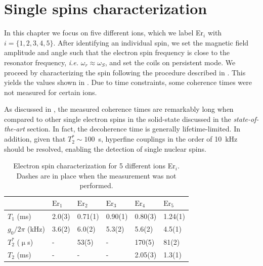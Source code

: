 
\section{Single \Er spins characterization}

In this chapter we focus on five different \Er ions, which we label Er$_i$ with $i=\{1,2,3,4,5\}$. After identifying an individual \Er spin, we set the magnetic field amplitude and angle such that the electron spin frequency is close to the resonator frequency, \textit{i.e.} $\omega_r\approx\omega_S$, and set the coils on persistent mode. We proceed by characterizing the spin following the procedure described in . This yields the values shown in . Due to time constraints, some coherence times were not measured for certain ions. 

As discussed in , the measured coherence times are remarkably long when compared to other single electron spins in the solid-state discussed in the \textit{state-of-the-art} section. In fact, the decoherence time is generally lifetime-limited. In addition, given that $T_2^*\sim100$~\textmu s, hyperfine couplings in the order of 10~kHz should be resolved, enabling the detection of single \W nuclear spins.

\begin{table}
\begin{tabular}{|l|l|l|l|l|l|}
\hline
                 & \textbf{$\mathrm{Er}_1$} & \textbf{$\mathrm{Er}_2$} & \textbf{$\mathrm{Er}_3$} & \textbf{$\mathrm{Er}_4$} & \textbf{$\mathrm{Er}_5$}  \\ \hline
$T_1$ (ms)       & 2.0(3)              & 0.71(1)             & 0.90(1)         & 0.80(3)          & 1.24(1)          \\ \hline
$g_0/2\pi$ (kHz) & 3.6(2)              & 6.0(2)              & 5.3(2)          & 5.6(2)           & 4.5(1)          \\ \hline
$T^*_2$ ($\upmu$s) & -                 & 53(5)               & -               & 170(5)           & 81(2)           \\ \hline
$T_2$ (ms)       & -                   & -                   & -               & 2.05(3)          & 1.3(1)           \\ \hline

\end{tabular}
\caption[Electron spin characterization]{Electron spin characterization for 5 different ions Er$_i$. Dashes are in place when the measurement was not performed.}
\end{table}

